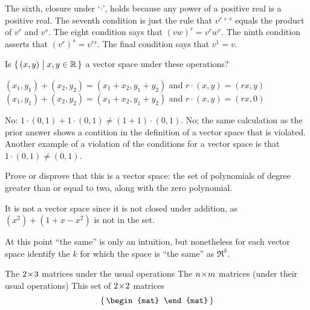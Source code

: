 \begin{exercises}
\begin{answer}
      The sixth, closure under `\( \cdot \)', 
      holds because any power of a positive real is a
      positive real.
      The seventh condition is just the rule that \( v^{r+s} \) equals
      the product of \( v^r \) and \( v^s \).
      The eight condition says that \( (vw)^r=v^rw^r \).
      The ninth condition asserts that \( (v^r)^s=v^{rs} \).
      The final condition says that \( v^1=v \).  
    \end{answer}
  \item 
      Is \( \mbox{$\{\,(x,y)\bigm| x,y\in\mathbb{R}\,\}$} \) a vector space under
      these operations?
      \begin{exparts}
        \partsitem \( (x_1,y_1)+(x_2,y_2)=(x_1+x_2,y_1+y_2) \)
        and \( r\cdot (x,y)=(rx,y) \)
        \partsitem \( (x_1,y_1)+(x_2,y_2)=(x_1+x_2,y_1+y_2) \)
        and \( r\cdot (x,y)=(rx,0) \)
      \end{exparts}
      \begin{answer}
        \begin{exparts}
           \partsitem No: \( 1\cdot(0,1)+1\cdot(0,1)\neq (1+1)\cdot(0,1) \).
           \partsitem No; the same calculation as the prior answer shows
              a contition in the definition of a vector space that is 
              violated. 
              Another example of a violation of the conditions for a 
              vector space is that \( 1\cdot (0,1)\neq (0,1) \). 
        \end{exparts}  
      \end{answer}
  \item 
    Prove or disprove that 
    this is a vector space: the set of polynomials of
    degree greater than or equal to two, along with the zero polynomial.
    \begin{answer}
      It is not a vector space since it is not closed under addition, as
      \( (x^2)+(1+x-x^2) \) is not in the set.  
    \end{answer}
  \item 
    At this point ``the same'' is only an
    intuition, but nonetheless for each vector space identify the
    \( k \) for which the space is ``the same'' as \( \Re^k \).
    \begin{exparts}
      \partsitem The \( 2 \! \times \! 3 \) matrices under the usual operations
      \partsitem The \( n \! \times \! m \) matrices (under their usual operations)
      \partsitem This set of \( 2 \! \times \! 2 \) matrices
        \begin{equation*}
          \set{\begin{mat}

\end{mat}}
\end{equation*}
\end{exparts}
\end{exercises}

